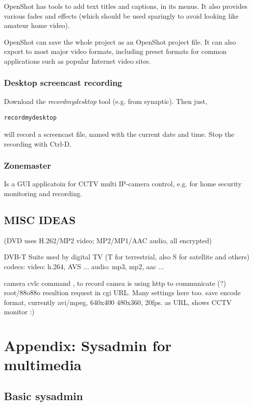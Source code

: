 \documentclass[oneside,english]{scrbook}
\begin{document}
OpenShot has tools to add text titles and captions, in its menus.  It also provides various fades and effects (which should be used sparingly to avoid looking like amateur home video).

OpenShot can save the whole project as an OpenShot project file.  It can also export to most major video formats, including preset formats for common applications such as popular Internet video sites.



\section{Desktop screencast recording}

Download the {\em recordmydesktop} tool (e.g. from synaptic). Then just,
\begin{lstlisting}
recordmydesktop
\end{lstlisting}
will record a screencast file, named with the current date and time.  Stop the recording with Ctrl-D.


\section{Zonemaster}
Is a GUI applicatoin for CCTV multi IP-camera control, e.g. for home security monitoring and recording.




\chapter{MISC IDEAS}



(DVD uses H.262/MP2 video;  MP2/MP1/AAC audio, all encrypted)

DVB-T Suite used by digital TV (T for terrestrial, also S for satellite and others)
	codecs:
		video: h.264, AVS ...
		audio: mp3, mp2, aac ...


camera cvlc command , to record
	camea is using http to communicate (?) root/88o88o
	resultion request in cgi URL.  Many settings here too.
	save encode format, currently avi/mpeg, 640x400
	480x360, 20fps.
	as URL, shows CCTV monitor :)

\part{Appendix: Sysadmin for multimedia}

\chapter{Basic sysadmin}
\end{document}
